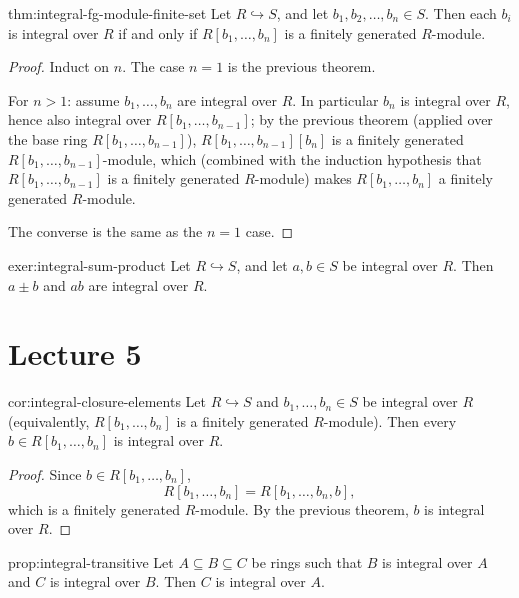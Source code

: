 \begin{theorem}{}{thm:integral-fg-module-finite-set}
Let $R \hookrightarrow S$, and let $b_1, b_2, \ldots, b_n \in S$. Then each $b_i$ is integral over $R$ if and only if $R[b_1, \ldots, b_n]$ is a finitely generated $R$-module.
\end{theorem}

\begin{proof}
Induct on $n$. The case $n=1$ is the previous theorem.

For $n > 1$: assume $b_1, \ldots, b_n$ are integral over $R$. In particular $b_n$ is integral over $R$, hence also integral over $R[b_1, \ldots, b_{n-1}]$; by the previous theorem (applied over the base ring $R[b_1,\ldots,b_{n-1}]$), $R[b_1, \ldots, b_{n-1}][b_n]$ is a finitely generated $R[b_1,\ldots,b_{n-1}]$-module, which (combined with the induction hypothesis that $R[b_1,\ldots,b_{n-1}]$ is a finitely generated $R$-module) makes $R[b_1,\ldots,b_n]$ a finitely generated $R$-module.

The converse is the same as the $n=1$ case.
\end{proof}

\begin{exercise}{}{exer:integral-sum-product}
Let $R \hookrightarrow S$, and let $a, b \in S$ be integral over $R$. Then $a \pm b$ and $ab$ are integral over $R$.
\end{exercise}

\section{Lecture 5}

\begin{corollary}{}{cor:integral-closure-elements}
Let $R \hookrightarrow S$ and $b_1, \ldots, b_n \in S$ be integral over $R$ (equivalently, $R[b_1,\ldots,b_n]$ is a finitely generated $R$-module). Then every $b \in R[b_1,\ldots,b_n]$ is integral over $R$.
\end{corollary}

\begin{proof}
Since $b \in R[b_1,\ldots,b_n]$,
\[
R[b_1,\ldots,b_n] = R[b_1,\ldots,b_n,b],
\]
which is a finitely generated $R$-module. By the previous theorem, $b$ is integral over $R$.
\end{proof}

\begin{proposition}{}{prop:integral-transitive}
Let $A \subseteq B \subseteq C$ be rings such that $B$ is integral over $A$ and $C$ is integral over $B$. Then $C$ is integral over $A$.
\end{proposition}

